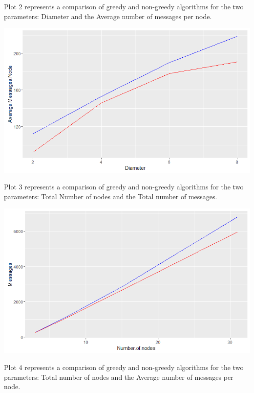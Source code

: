 \documentclass{article}
\begin{document}
Plot 2 represents a comparison of greedy and non-greedy algorithms for the two parameters: Diameter and the Average number of messages per node. \\

\begin{center}
    \includegraphics[width=\textwidth]{figs/Plot2} \\
\end{center}

Plot 3 represents a comparison of greedy and non-greedy algorithms for the two parameters: Total Number of nodes and the Total number of messages. \\

\begin{center}
    \includegraphics[width=\textwidth]{figs/Plot3} \\
\end{center}

Plot 4 represents a comparison of greedy and non-greedy algorithms for the two parameters: Total number of nodes and the Average number of messages per node. \\
\end{document}
